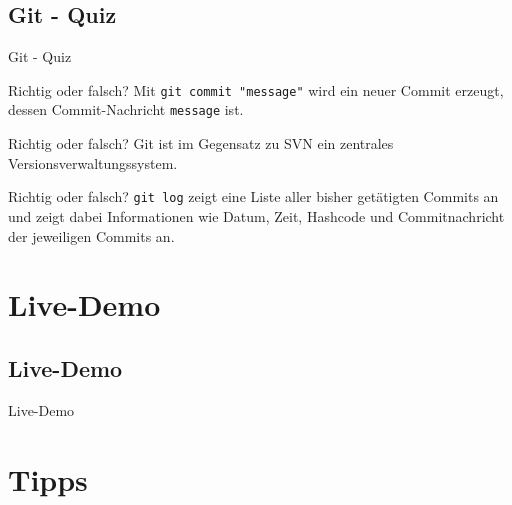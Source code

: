 \documentclass[18pt]{beamer}
\begin{document}
	\subsection{Git - Quiz}
	\begin{frame}{Git - Quiz}
		\begin{block}{Richtig oder falsch?}
			Mit \texttt{git commit "message"} wird ein neuer Commit erzeugt, dessen Commit-Nachricht \texttt{message} ist.
		\end{block}
		\pause
		\begin{block}{Richtig oder falsch?}
			Git ist im Gegensatz zu SVN ein zentrales Versionsverwaltungssystem.
		\end{block}
		\pause
		\begin{block}{Richtig oder falsch?}
			\texttt{git log} zeigt eine Liste aller bisher getätigten Commits an und zeigt dabei Informationen wie Datum, Zeit, Hashcode und Commitnachricht der jeweiligen Commits an.
		\end{block}
	\end{frame}
		
\section{Live-Demo}		
	\subsection{Live-Demo}
	\begin{frame}
		\centering Live-Demo
	\end{frame}
		
\section{Tipps}
\end{document}
